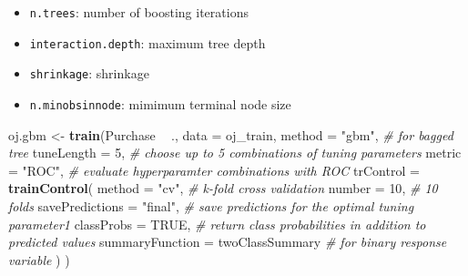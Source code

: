 \documentclass[
]{book}
\newenvironment{Shaded}{\begin{snugshade}}{\end{snugshade}}
\newcommand{\CommentTok}[1]{\textcolor[rgb]{0.56,0.35,0.01}{\textit{#1}}}
\newcommand{\DataTypeTok}[1]{\textcolor[rgb]{0.13,0.29,0.53}{#1}}
\newcommand{\DecValTok}[1]{\textcolor[rgb]{0.00,0.00,0.81}{#1}}
\newcommand{\KeywordTok}[1]{\textcolor[rgb]{0.13,0.29,0.53}{\textbf{#1}}}
\newcommand{\NormalTok}[1]{#1}
\newcommand{\OperatorTok}[1]{\textcolor[rgb]{0.81,0.36,0.00}{\textbf{#1}}}
\newcommand{\OtherTok}[1]{\textcolor[rgb]{0.56,0.35,0.01}{#1}}
\newcommand{\StringTok}[1]{\textcolor[rgb]{0.31,0.60,0.02}{#1}}
\providecommand{\tightlist}{%
  \setlength{\itemsep}{0pt}\setlength{\parskip}{0pt}}
\begin{document}
\begin{itemize}
\tightlist
\item
  \texttt{n.trees}: number of boosting iterations
\item
  \texttt{interaction.depth}: maximum tree depth
\item
  \texttt{shrinkage}: shrinkage
\item
  \texttt{n.minobsinnode}: mimimum terminal node size
\end{itemize}

\begin{Shaded}
\begin{Highlighting}[]
\NormalTok{oj.gbm <-}\StringTok{ }\KeywordTok{train}\NormalTok{(Purchase }\OperatorTok{~}\StringTok{ }\NormalTok{., }
               \DataTypeTok{data =}\NormalTok{ oj_train, }
               \DataTypeTok{method =} \StringTok{"gbm"}\NormalTok{,  }\CommentTok{# for bagged tree}
               \DataTypeTok{tuneLength =} \DecValTok{5}\NormalTok{,  }\CommentTok{# choose up to 5 combinations of tuning parameters}
               \DataTypeTok{metric =} \StringTok{"ROC"}\NormalTok{,  }\CommentTok{# evaluate hyperparamter combinations with ROC}
               \DataTypeTok{trControl =} \KeywordTok{trainControl}\NormalTok{(}
                 \DataTypeTok{method =} \StringTok{"cv"}\NormalTok{,  }\CommentTok{# k-fold cross validation}
                 \DataTypeTok{number =} \DecValTok{10}\NormalTok{,  }\CommentTok{# 10 folds}
                 \DataTypeTok{savePredictions =} \StringTok{"final"}\NormalTok{,       }\CommentTok{# save predictions for the optimal tuning parameter1}
                      \DataTypeTok{classProbs =} \OtherTok{TRUE}\NormalTok{,  }\CommentTok{# return class probabilities in addition to predicted values}
                      \DataTypeTok{summaryFunction =}\NormalTok{ twoClassSummary  }\CommentTok{# for binary response variable}
\NormalTok{                      )}
\NormalTok{                    )}
\end{Highlighting}
\end{Shaded}
\end{document}

